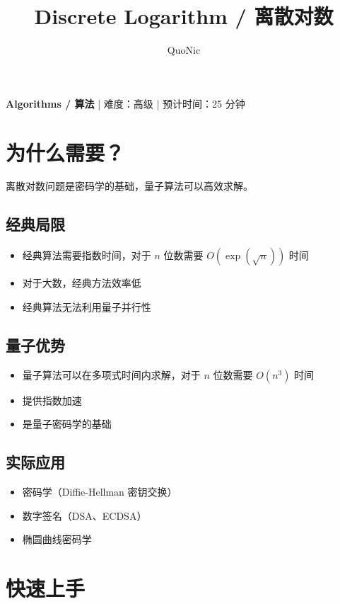 \documentclass[12pt,a4paper]{article}
\title{Discrete Logarithm / 离散对数}
\author{QuoNic}
\date{}
\begin{document}
\maketitle

\begin{center}
\textbf{Algorithms / 算法} | 难度：高级 | 预计时间：25 分钟
\end{center}

\tableofcontents
\newpage

\section{为什么需要？}

离散对数问题是密码学的基础，量子算法可以高效求解。

\subsection{经典局限}
\begin{itemize}
  \item 经典算法需要指数时间，对于 $n$ 位数需要 $O(\exp(\sqrt{n}))$ 时间
  \item 对于大数，经典方法效率低
  \item 经典算法无法利用量子并行性
\end{itemize}

\subsection{量子优势}
\begin{itemize}
  \item 量子算法可以在多项式时间内求解，对于 $n$ 位数需要 $O(n^3)$ 时间
  \item 提供指数加速
  \item 是量子密码学的基础
\end{itemize}

\subsection{实际应用}
\begin{itemize}
  \item 密码学（Diffie-Hellman 密钥交换）
  \item 数字签名（DSA、ECDSA）
  \item 椭圆曲线密码学
\end{itemize}

\section{快速上手}
\end{document}
